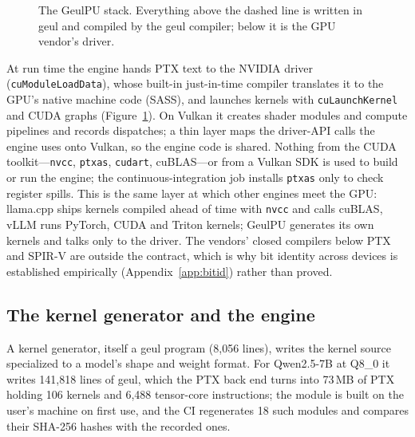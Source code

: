 \documentclass[11pt]{article}
\begin{document}
\begin{figure}[t]
\caption{The GeulPU stack. Everything above the dashed line is written in geul and compiled by the geul compiler; below it
is the GPU vendor's driver.}
\label{fig:stack}
\end{figure}

At run time the engine hands PTX text to the NVIDIA driver (\texttt{cuModuleLoadData}), whose built-in just-in-time compiler
translates it to the GPU's native machine code (SASS), and launches kernels with \texttt{cuLaunchKernel} and CUDA graphs
(Figure~\ref{fig:stack}). On Vulkan it creates shader modules and compute pipelines and records dispatches; a thin layer maps
the driver-API calls the engine uses onto Vulkan, so the engine code is shared. Nothing from the CUDA toolkit---\texttt{nvcc},
\texttt{ptxas}, \texttt{cudart}, cuBLAS---or from a Vulkan SDK is used to build or run the engine; the
continuous-integration job installs \texttt{ptxas} only to check register spills. This is the same layer at which other
engines meet the GPU: llama.cpp ships kernels compiled ahead of time with \texttt{nvcc} and calls cuBLAS, vLLM runs PyTorch,
CUDA and Triton kernels; GeulPU generates its own kernels and talks only to the driver. The vendors' closed compilers below
PTX and SPIR-V are outside the contract, which is why bit identity across devices is established empirically
(Appendix~\ref{app:bitid}) rather than proved.

\subsection{The kernel generator and the engine}

A kernel generator, itself a geul program (8,056 lines), writes the kernel source specialized to a model's shape and weight
format. For Qwen2.5-7B at Q8\_0 it writes 141,818 lines of geul, which the PTX back end turns into 73\,MB of PTX holding 106
kernels and 6,488 tensor-core instructions; the module is built on the user's machine on first use, and the CI regenerates
18 such modules and compares their SHA-256 hashes with the recorded ones.
\end{document}
